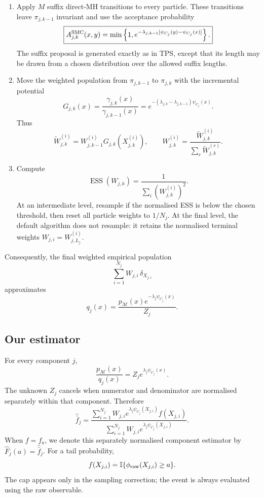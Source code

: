 \documentclass[11pt,a4paper]{article}
\newcommand{\pM}{p_{\mathcal M}}
\newcommand{\1}{\mathbb I}
\newcommand{\ESS}{\operatorname{ESS}}
\begin{document}
\begin{enumerate}[label=\arabic*.]
    \item Apply $M$ suffix direct-MH transitions to every particle. These
    transitions leave $\pi_{j,k-1}$ invariant and use the acceptance
    probability
    \[
    \boxed{
    A_{j,k}^{\rm SMC}(x,y)
    =
    \min\left\{
    1,
    e^{-\lambda_{j,k-1}
    [\psi_{C_j}(y)-\psi_{C_j}(x)]}
    \right\}.}
    \]
    The suffix proposal is generated exactly as in TPS, except that its length
    may be drawn from a chosen distribution over the allowed suffix lengths.

    \item Move the weighted population from $\pi_{j,k-1}$ to $\pi_{j,k}$ with
    the incremental potential
    \[
    G_{j,k}(x)
    =
    \frac{\gamma_{j,k}(x)}{\gamma_{j,k-1}(x)}
    =
    e^{-(\lambda_{j,k}-\lambda_{j,k-1})\psi_{C_j}(x)}.
    \]
    Thus
    \[
    \widetilde W_{j,k}^{(i)}
    =
    W_{j,k-1}^{(i)}G_{j,k}(X_{j,k}^{(i)}),
    \qquad
    W_{j,k}^{(i)}
    =
    \frac{\widetilde W_{j,k}^{(i)}}{
    \sum_r\widetilde W_{j,k}^{(r)}}.
    \]

    \item Compute
    \[
    \ESS(W_{j,k})
    =
    \frac{1}{\sum_i(W_{j,k}^{(i)})^2}.
    \]
    At an intermediate level, resample if the normalised ESS is below the
    chosen threshold, then reset all particle weights to $1/N_j$. At the final
    level, the default algorithm does not resample: it retains the normalised
    terminal weights $W_{j,i}=W_{j,L_j}^{(i)}$.
\end{enumerate}

Consequently, the final weighted empirical population
\[
\sum_{i=1}^{N_j}W_{j,i}\,\delta_{X_{j,i}}
\]
approximates
\[
q_j(x)
=
\frac{
\pM(x)e^{-\lambda_j\psi_{C_j}(x)}
}{Z_j}.
\]

\subsection{Our estimator}

For every component $j$,
\[
\frac{\pM(x)}{q_j(x)}
=
Z_j e^{\lambda_j\psi_{C_j}(x)}.
\]
The unknown $Z_j$ cancels when numerator and denominator are normalised
separately within that component. Therefore
\[
\boxed{
\widehat{\bar f}_j
=
\frac{
\displaystyle
\sum_{i=1}^{N_j}
W_{j,i}e^{\lambda_j\psi_{C_j}(X_{j,i})}f(X_{j,i})
}{
\displaystyle
\sum_{i=1}^{N_j}
W_{j,i}e^{\lambda_j\psi_{C_j}(X_{j,i})}
}.}
\]
When $f=f_a$, we denote this separately normalised component estimator by
$\widehat F_j(a)=\widehat{\bar f}_j$.
For a tail probability,
\[
f(X_{j,i})
=
\1\{\phi_{\rm raw}(X_{j,i})\geq a\}.
\]
The cap appears only in the sampling correction; the event is always evaluated
using the raw observable.
\end{document}

